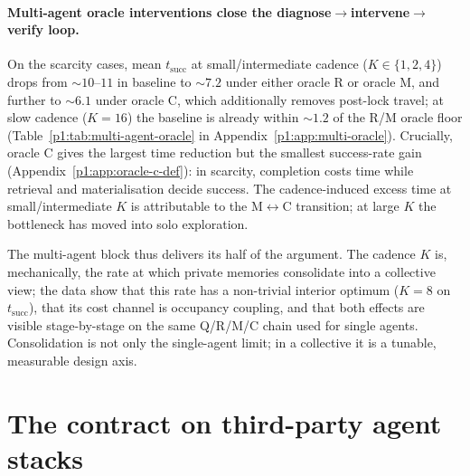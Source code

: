 \documentclass{article}
\begin{document}
\paragraph{Multi-agent oracle interventions close the diagnose$\to$intervene$\to$verify loop.}
On the scarcity cases, mean $t_{\mathrm{succ}}$ at small/intermediate cadence ($K{\in}\{1,2,4\}$) drops from $\sim10$--$11$ in baseline to $\sim7.2$ under either oracle R or oracle M, and further to $\sim6.1$ under oracle C, which additionally removes post-lock travel; at slow cadence ($K{=}16$) the baseline is already within $\sim1.2$ of the R/M oracle floor (Table~\ref{p1:tab:multi-agent-oracle} in Appendix~\ref{p1:app:multi-oracle}). Crucially, oracle C gives the largest time reduction but the smallest success-rate gain (Appendix~\ref{p1:app:oracle-c-def}): in scarcity, completion costs time while retrieval and materialisation decide success. The cadence-induced excess time at small/intermediate $K$ is attributable to the M$\leftrightarrow$C transition; at large $K$ the bottleneck has moved into solo exploration.

The multi-agent block thus delivers its half of the argument. The
cadence $K$ is, mechanically, the rate at which private memories
consolidate into a collective view; the data show that this rate has a
non-trivial interior optimum ($K\!=\!8$ on $t_{\mathrm{succ}}$), that
its cost channel is occupancy coupling, and that both effects are
visible stage-by-stage on the same Q/R/M/C chain used for single
agents. Consolidation is not only the single-agent limit; in a
collective it is a tunable, measurable design axis.

\section{The contract on third-party agent stacks}
\label{p1:sec:external}
\end{document}
